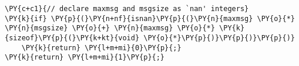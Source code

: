 \begin{Verbatim}[commandchars=\\\{\},codes={\catcode`\$=3\catcode`\^=7\catcode`\_=8}]
\PY{c+c1}{// declare maxmsg and msgsize as `nan' integers}
\PY{k}{if} \PY{p}{(}\PY{n+nf}{isnan}\PY{p}{(}\PY{n}{maxmsg} \PY{o}{*} \PY{n}{msgsize} \PY{o}{+} \PY{n}{maxmsg} \PY{o}{*} \PY{k}{sizeof}\PY{p}{(}\PY{k+kt}{void} \PY{o}{*}\PY{p}{)}\PY{p}{)}\PY{p}{)}
    \PY{k}{return} \PY{l+m+mi}{0}\PY{p}{;}
\PY{k}{return} \PY{l+m+mi}{1}\PY{p}{;}
\end{Verbatim}
